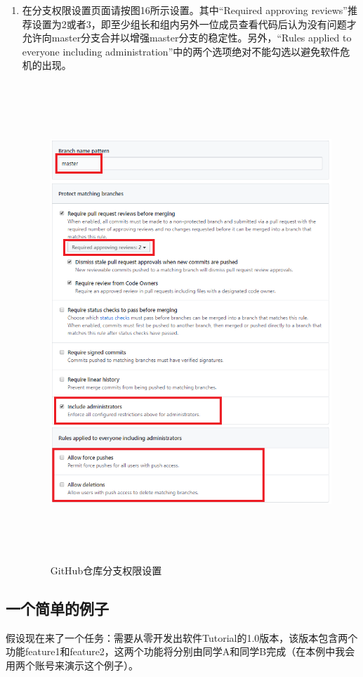 \documentclass[a4paper,14pt]{article}
\begin{document}
\begin{enumerate}[1. ]
\item 在分支权限设置页面请按图16所示设置。其中“Required approving reviews”推荐设置为2或者3，即至少组长和组内另外一位成员查看代码后认为没有问题才允许向master分支合并以增强master分支的稳定性。另外，“Rules applied to everyone including administration”中的两个选项绝对不能勾选以避免软件危机的出现。
\begin{figure}[h]
\centering
\includegraphics[height=18cm]{figure/branch_rule2}
\caption{GitHub仓库分支权限设置}
\end{figure}
\end{enumerate}


\newpage
\subsection*{一个简单的例子}

假设现在来了一个任务：需要从零开发出软件Tutorial的1.0版本，该版本包含两个功能feature1和feature2，这两个功能将分别由同学A和同学B完成（在本例中我会用两个账号来演示这个例子）。
\end{document}
